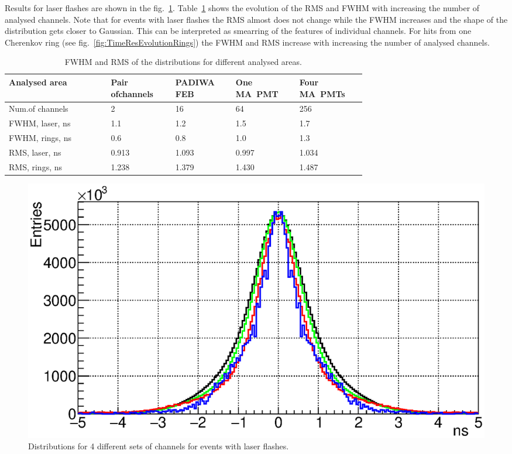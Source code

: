 \documentclass{JACoW-GSI-2015}
\begin{document}
Results for laser flashes are shown in the fig.~\ref{fig:TimeResEvolutionLaser}. Table~\ref{tabl:EvolutionParams} shows the evolution of the RMS and FWHM with increasing the number of analysed channels. Note that for events with laser flashes the RMS almost does not change while the FWHM increases and the shape of the distribution gets closer to Gaussian. This can be interpreted as smearring of the features of individual channels. For hits from one Cherenkov ring (see fig.~\ref{fig:TimeResEvolutionRings}) the FWHM and RMS increase with increasing the number of analysed channels.

\begin{table}[tbh]
\caption{FWHM and RMS of the distributions for different analysed areas.}
\label{tabl:EvolutionParams}
\begin{tabular}{ | p{0.22\linewidth} | p{0.13\linewidth} | p{0.12\linewidth} | p{0.12\linewidth} | p{0.12\linewidth} | }
	\hline
	\scriptsize{Analysed area} & \scriptsize{Pair ofchannels} & \scriptsize{PADIWA FEB} & \scriptsize{One MA~PMT} & \scriptsize{Four MA~PMTs} \\
	\hline
	\scriptsize{Num.of channels} & 2 & 16 & 64 & 256 \\
	\hline
	\scriptsize{FWHM, laser, ns} & 1.1 & 1.2 & 1.5 & 1.7 \\
	\hline
	\scriptsize{FWHM, rings, ns} & 0.6 & 0.8 & 1.0 & 1.3 \\
	\hline
	\scriptsize{RMS, laser, ns} & 0.913 & 1.093 & 0.997 & 1.034 \\
	\hline
	\scriptsize{RMS, rings, ns} & 1.238 & 1.379 & 1.430 & 1.487 \\
	\hline
\end{tabular}
\end{table}

\begin{figure}[tbh]
\includegraphics[width=0.9\linewidth]{../PTE/pictures/24_TimePrecision_evolution_laser_feb2017.eps}
\caption{Distributions for 4 different sets of channels for events with laser flashes.}
\label{fig:TimeResEvolutionLaser}
\end{figure}
\end{document}
